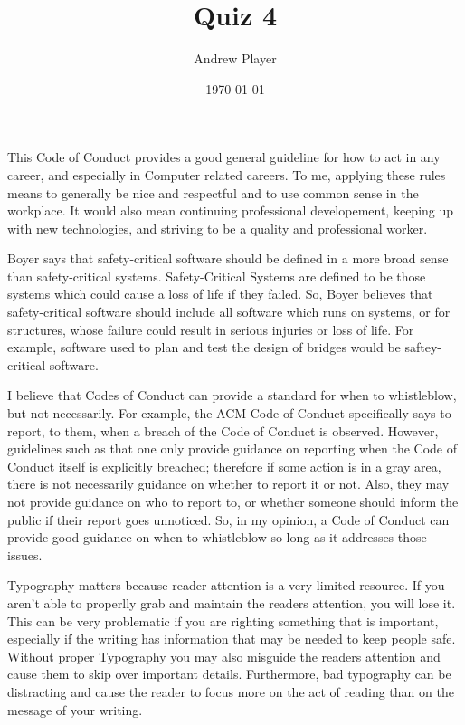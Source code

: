 \documentclass[12pt]{article}
\title{Quiz 4}
\author{Andrew Player}
\date{\today}
\makeatletter
\theoremstyle{homework}
\newenvironment{exercise}[1]
{\def\@currentlabel{#1}\exercisecore}
{\endexercisecore}
\makeatother
\begin{document}
\maketitle

\begin{exercise}{Question \# 1}
\end{exercise}
\noindent
This Code of Conduct provides a good general guideline for how to act 
in any career, and especially in Computer related careers. To me, applying 
these rules means to generally be nice and respectful and to use common sense 
in the workplace. It would also mean continuing professional developement, keeping
up with new technologies, and striving to be a quality and professional worker.


\begin{exercise}{Question \# 2}
\end{exercise}
\noindent
Boyer says that safety-critical software should be defined in a more broad
sense than safety-critical systems. Safety-Critical Systems are defined to 
be those systems which could cause a loss of life if they failed. So, Boyer 
believes that safety-critical software should include all software which runs 
on systems, or for structures, whose failure could result in serious injuries
or loss of life. For example, software used to plan and test the design of 
bridges would be saftey-critical software.

\begin{exercise}{Question \# 3}
\end{exercise}
\noindent
I believe that Codes of Conduct can provide a standard for when to whistleblow, 
but not necessarily. For example, the ACM Code of Conduct specifically says
to report, to them, when a breach of the Code of Conduct is observed. However,
guidelines such as that one only provide guidance on reporting when the Code of 
Conduct itself is explicitly breached; therefore if some action is in a gray area,
there is not necessarily guidance on whether to report it or not. Also, they may not provide 
guidance on who to report to, or whether someone should inform the public if their 
report goes unnoticed. So, in my opinion, a Code of Conduct can provide good guidance on
when to whistleblow so long as it addresses those issues.
\newline
\newline
\newline
\newline
 
\begin{exercise}{Question \# 4}
\end{exercise}
\noindent
Typography matters because reader attention is a very limited resource. If you aren't 
able to properlly grab and maintain the readers attention, you will lose it. This can 
be very problematic if you are righting something that is important, especially if the 
writing has information that may be needed to keep people safe. Without proper Typography
you may also misguide the readers attention and cause them to skip over important details.
Furthermore, bad typography can be distracting and cause the reader to focus more on the act
of reading than on the message of your writing.
\end{document}
